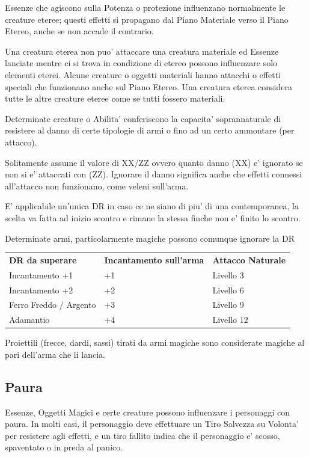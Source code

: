 \documentclass[a4paper,11pt,twoside,openany]{book}
\begin{document}
{		Essenze che agiscono sulla Potenza o protezione influenzano normalmente le creature eteree; questi effetti si propagano dal Piano Materiale verso il Piano Etereo, anche se non accade il contrario.
		
		Una creatura eterea non puo' attaccare una creatura materiale ed Essenze lanciate mentre ci si trova in condizione di etereo possono influenzare solo elementi eterei. Alcune creature o oggetti materiali hanno attacchi o effetti speciali che funzionano anche sul Piano Etereo. Una creatura eterea considera tutte le altre creature eteree come se tutti fossero materiali.
		
		
		Determinate creature o Abilita' conferiscono la capacita' soprannaturale di resistere al danno di certe tipologie di armi o fino ad un certo ammontare (per attacco).
		
		Solitamente assume il valore di XX/ZZ ovvero quanto danno (XX) e' ignorato se non si e' attaccati con (ZZ). Ignorare il danno significa anche che effetti connessi all'attacco non funzionano, come veleni sull'arma.
		
		E' applicabile un'unica DR in caso ce ne siano di piu' di una contemporanea, la scelta va fatta ad inizio scontro e rimane la stessa finche non e' finito lo scontro.
		
		Determinate armi, particolarmente magiche possono comunque ignorare la DR 
		
		\bigskip
		
		\begin{tabular}{lll}
			\toprule
			\textbf{DR da superare} & \textbf{Incantamento sull'arma} & \textbf{Attacco Naturale}\tabularnewline
			Incantamento +1 & +1 & Livello 3\tabularnewline
			Incantamento +2 & +2 & Livello 6\tabularnewline
			Ferro Freddo / Argento & +3 & Livello 9\tabularnewline
			Adamantio & +4 & Livello 12\tabularnewline
			
		\end{tabular}
		
		Proiettili (frecce, dardi, sassi) tirati da armi magiche sono considerate
		magiche al pari dell'arma che li lancia.
		
		
		
		\subsection{Paura}
		
		\label{paura}
		
		Essenze, Oggetti Magici e certe creature possono influenzare i personaggi con paura. In molti casi, il personaggio deve effettuare un Tiro Salvezza su Volonta' per resistere agli effetti, e un tiro fallito indica che il personaggio e' scosso, spaventato o in preda al panico.
		
}
\end{document}
